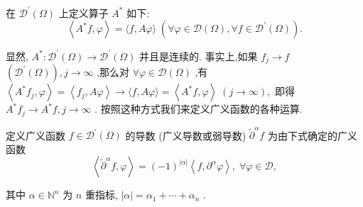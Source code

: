 \documentclass[lang=cn,newtx,10pt,scheme=chinese,thmcnt=chapter]{elegantbook}
\begin{document}
在 \( {\mathcal{D}}^{\prime }\left( \Omega \right) \) 上定义算子 \( {A}^{ * } \) 如下:
\[\left\langle  {{A}^{ * }f,\varphi }\right\rangle   = \langle f,{A\varphi }\rangle \;\left( {\forall \varphi  \in  \mathcal{D}\left( \Omega \right) ,\forall f \in  {\mathcal{D}}^{\prime }\left( \Omega \right) }\right) . \]

显然, \( {A}^{ * } : {\mathcal{D}}^{\prime }\left( \Omega \right)  \rightarrow  {\mathcal{D}}^{\prime }\left( \Omega \right) \) 并且是连续的. 事实上,如果 \( {f}_{j} \rightarrow  f \)
\( \left( {{\mathcal{D}}^{\prime }\left( \Omega \right) }\right) ,j \rightarrow  \infty \) ,那么对 \( \forall \varphi  \in  \mathcal{D}\left( \Omega \right) \) ,有
\( \left\langle  {{A}^{ * }{f}_{j},\varphi }\right\rangle   = \left\langle  {{f}_{j},{A\varphi }}\right\rangle   \rightarrow  \langle f,{A\varphi }\rangle  = \left\langle  {{A}^{ * }f,\varphi }\right\rangle  \;\left( {j \rightarrow  \infty }\right) , \)
即得 \( {A}^{ * }{f}_{j} \rightarrow  {A}^{ * }f,j \rightarrow  \infty \) .
按照这种方式我们来定义广义函数的各种运算.
\begin{definition}
  定义广义函数 \(f \in  {\mathcal{D}}^{\prime }\left( \Omega \right)\) 的导数 (广义导数或弱导数) \(\widetilde{\partial } ^{\alpha }f\) 为由下式确定的广义函数
\begin{equation*}
  \left\langle  {\widetilde{\partial }^{\alpha }f,\varphi }\right\rangle   = {\left( -1\right) }^{\left| \alpha \right| }\left\langle  {f,{\partial }^{\alpha }\varphi }\right\rangle  ,\;\forall \varphi  \in  \mathcal{D},
  \end{equation*}
  
  其中 \(\alpha  \in  {\mathbb{N}}^{n}\) 为 \(n\) 重指标, \(\left| \alpha \right|  = {\alpha }_{1} + \cdots  + {\alpha }_{n}\) .
  
\end{definition}
\end{document}
